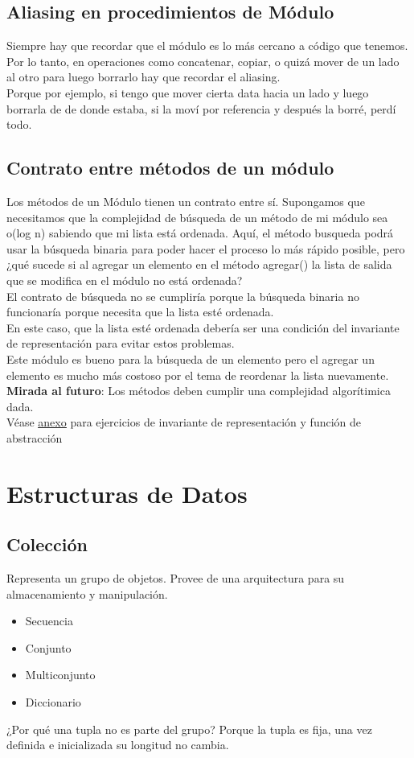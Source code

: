 \documentclass[10pt,a4paper]{article}
\begin{document}
\subsection*{Aliasing en procedimientos de Módulo}
Siempre hay que recordar que el módulo es lo más cercano a código que tenemos. Por lo tanto, en operaciones como concatenar, copiar, o quizá mover de un lado al otro para luego borrarlo hay que recordar el aliasing. \\
Porque por ejemplo, si tengo que mover cierta data hacia un lado y luego borrarla de de donde estaba, si la moví por referencia y después la borré, perdí todo. 

\subsection*{Contrato entre métodos de un módulo}
Los métodos de un Módulo tienen un contrato entre sí.
Supongamos que necesitamos que la complejidad de búsqueda de un método de mi módulo sea o(log n) sabiendo que mi lista está ordenada. Aquí, el método busqueda podrá usar la búsqueda binaria para poder hacer el proceso lo más rápido posible, pero ¿qué sucede si al agregar un elemento en el método agregar() la lista de salida que se modifica en el módulo no está ordenada? \\ El contrato de búsqueda no se cumpliría porque la búsqueda binaria no funcionaría porque necesita que la lista esté ordenada. \\

En este caso, que la lista esté ordenada debería ser una condición del invariante de representación para evitar estos problemas. \\

Este módulo es bueno para la búsqueda de un elemento pero el agregar un elemento es mucho más costoso por el tema de reordenar la lista nuevamente. \\

\textbf{Mirada al futuro}: Los métodos deben cumplir una complejidad algorítimica dada. \\
Véase \hyperref[subsec:anexo_invrep_abs]{\underline{anexo}} para ejercicios de invariante de representación y función de abstracción
\section*{Estructuras de Datos}
\subsection*{Colección}
Representa un grupo de objetos. Provee de una arquitectura para su almacenamiento y manipulación.
\begin{itemize}
    \item Secuencia
    \item Conjunto
    \item Multiconjunto
    \item Diccionario
\end{itemize}
¿Por qué una tupla no es parte del grupo? Porque la tupla es fija, una vez definida e inicializada su longitud no cambia.
\end{document}
